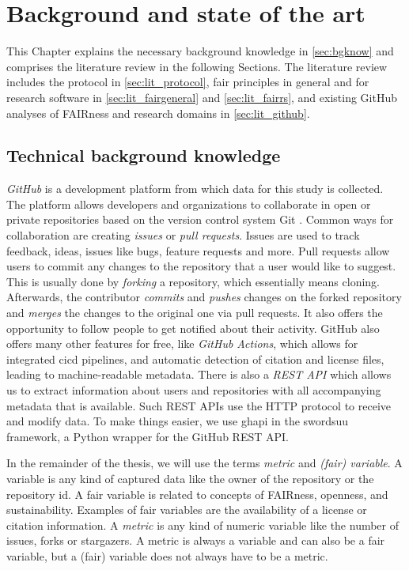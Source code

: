 
\chapter{Background and state of the art}
\label{chap:literature}
This Chapter explains the necessary background knowledge in \autoref{sec:bgknow} and comprises the literature review in the following Sections. The literature review includes the protocol in \autoref{sec:lit_protocol}, \acrshort{fair} principles in general and for research software in \autoref{sec:lit_fairgeneral} and \autoref{sec:lit_fairrs}, and existing GitHub analyses of FAIRness and research domains in \autoref{sec:lit_github}.

\section{Technical background knowledge}
\label{sec:bgknow}
\textit{GitHub} is a development platform from which data for this study is collected. The platform allows developers and organizations to collaborate in open or private repositories based on the version control system Git \cite{chacon2014pro}. Common ways for collaboration are creating \textit{issues} or \textit{pull requests}. Issues are used to track feedback, ideas, issues like bugs, feature requests and more. Pull requests allow users to commit any changes to the repository that a user would like to suggest. 
This is usually done by \textit{forking} a repository, which essentially means cloning. Afterwards, the contributor \textit{commits} and \textit{pushes} changes on the forked repository and \textit{merges} the changes to the original one via pull requests. It also offers the opportunity to follow people to get notified about their activity.
GitHub also offers many other features for free, like \textit{GitHub Actions}, which allows for integrated \acrfull{cicd} pipelines, and automatic detection of citation and license files, leading to machine-readable metadata. There is also a \textit{REST API} \cite{github_rest} which allows us to extract information about users and repositories with all accompanying metadata that is available. Such REST APIs use the HTTP protocol to receive and modify data. To make things easier, we use ghapi \cite{noauthor_ghapi_nodate} in the \acrshort{swordsuu} framework, a Python wrapper for the GitHub REST API.

In the remainder of the thesis, we will use the terms \textit{metric} and \textit{(\acrshort{fair}) variable}. A variable is any kind of captured data like the owner of the repository or the repository id. A \acrshort{fair} variable is related to concepts of FAIRness, openness, and sustainability. Examples of \acrshort{fair} variables are the availability of a license or citation information. A \textit{metric} is any kind of numeric variable like the number of issues, forks or stargazers. A metric is always a variable and can also be a \acrshort{fair} variable, but a (\acrshort{fair}) variable does not always have to be a metric.

